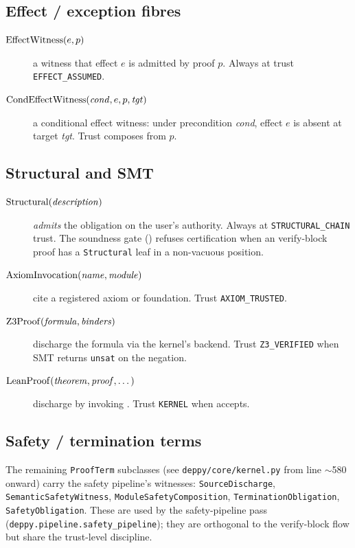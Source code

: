 \subsection{Effect / exception fibres}

\begin{description}
  \item[$\mathrm{EffectWitness}(e, p)$] a witness that effect $e$ is admitted by
    proof $p$.  Always at trust \texttt{EFFECT\_ASSUMED}.
  \item[$\mathrm{CondEffectWitness}(\mathit{cond}, e, p, \mathit{tgt})$] a conditional
    effect witness: under precondition \emph{cond}, effect $e$ is
    absent at target \emph{tgt}.  Trust composes from $p$.
\end{description}

\subsection{Structural and SMT}

\begin{description}
  \item[$\mathrm{Structural}(\mathit{description})$] \emph{admits} the obligation
    on the user's authority.  Always at \texttt{STRUCTURAL\_CHAIN}
    trust.  The soundness gate () refuses
    certification when an verify-block proof has a \texttt{Structural}
    leaf in a non-vacuous position.
  \item[$\mathrm{AxiomInvocation}(\mathit{name}, \mathit{module})$] cite a registered
    axiom or foundation.  Trust \texttt{AXIOM\_TRUSTED}.
  \item[$\mathrm{Z3Proof}(\mathit{formula}, \mathit{binders})$] discharge the
    formula via the kernel's \Zthree{} backend.  Trust
    \texttt{Z3\_VERIFIED} when SMT returns \texttt{unsat} on the
    negation.
  \item[$\mathrm{LeanProof}(\mathit{theorem}, \mathit{proof}, \dots)$] discharge
    by invoking \Lean{}.  Trust \texttt{KERNEL} when \Lean{}
    accepts.
\end{description}

\subsection{Safety / termination terms}

The remaining \texttt{ProofTerm} subclasses (see
\texttt{deppy/core/kernel.py} from line $\sim$580 onward) carry
the safety pipeline's witnesses: \texttt{SourceDischarge},
\texttt{SemanticSafetyWitness}, \texttt{ModuleSafetyComposition},
\texttt{TerminationObligation}, \texttt{SafetyObligation}.  These
are used by the safety-pipeline pass (\texttt{deppy.pipeline.safety\_pipeline});
they are orthogonal to the \PSDL{} verify-block flow but share the
trust-level discipline.

